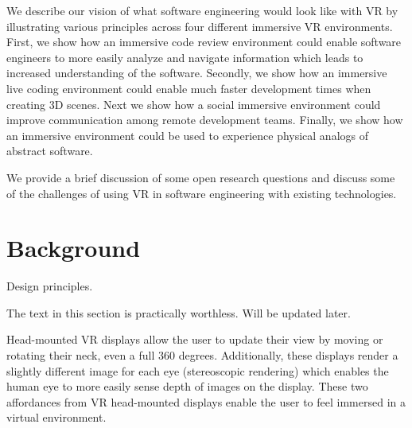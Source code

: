 \documentclass[conference]{IEEEtran}
\begin{document}

We describe our vision of what software engineering would look like with VR by illustrating various principles across four different immersive VR environments.
First, we show how an immersive code review environment could enable software engineers to more easily analyze and navigate information which leads to increased understanding of the software.
Secondly, we show how an immersive live coding environment could enable much faster development times when creating 3D scenes.
Next we show how a social immersive environment could improve communication among remote development teams.
Finally, we show how an immersive environment could be used to experience physical analogs of abstract software.

We provide a brief discussion of some open research questions and discuss some of the challenges of using VR in software engineering with existing technologies.



\section{Background}


Design principles.

The text in this section is practically worthless. Will be updated later.

Head-mounted VR displays allow the user to update their view by moving or rotating their neck, even a full 360 degrees.
Additionally, these displays render a slightly different image for each eye (stereoscopic rendering) which enables the human eye to more easily sense depth of images on the display.
These two affordances from VR head-mounted displays enable the user to feel immersed in a virtual environment.
\end{document}

